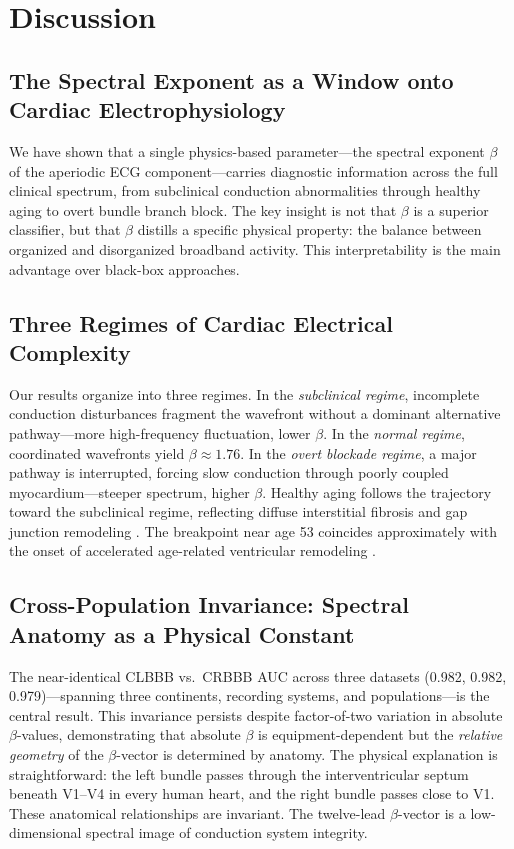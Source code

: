 \documentclass[11pt,a4paper]{article}
\begin{document}
\section{Discussion}
\subsection{The Spectral Exponent as a Window onto Cardiac Electrophysiology}
We have shown that a single physics-based parameter---the spectral exponent $\beta$ of the aperiodic ECG component---carries diagnostic information across the full clinical spectrum, from subclinical conduction abnormalities through healthy aging to overt bundle branch block. The key insight is not that $\beta$ is a superior classifier, but that $\beta$ distills a specific physical property: the balance between organized and disorganized broadband activity. This interpretability is the main advantage over black-box approaches.
\subsection{Three Regimes of Cardiac Electrical Complexity}
Our results organize into three regimes. In the \textit{subclinical regime}, incomplete conduction disturbances fragment the wavefront without a dominant alternative pathway---more high-frequency fluctuation, lower $\beta$. In the \textit{normal regime}, coordinated wavefronts yield $\beta \approx 1.76$. In the \textit{overt blockade regime}, a major pathway is interrupted, forcing slow conduction through poorly coupled myocardium---steeper spectrum, higher $\beta$.
Healthy aging follows the trajectory toward the subclinical regime, reflecting diffuse interstitial fibrosis and gap junction remodeling \citep{deJong2011, Jansen2010}. The breakpoint near age 53 coincides approximately with the onset of accelerated age-related ventricular remodeling \citep{Cheng2009}.
\subsection{Cross-Population Invariance: Spectral Anatomy as a Physical Constant}
The near-identical CLBBB vs.\ CRBBB AUC across three datasets (0.982, 0.982, 0.979)---spanning three continents, recording systems, and populations---is the central result. This invariance persists despite factor-of-two variation in absolute $\beta$-values, demonstrating that absolute $\beta$ is equipment-dependent but the \textit{relative geometry} of the $\beta$-vector is determined by anatomy.
The physical explanation is straightforward: the left bundle passes through the interventricular septum beneath V1--V4 in every human heart, and the right bundle passes close to V1. These anatomical relationships are invariant. The twelve-lead $\beta$-vector is a low-dimensional spectral image of conduction system integrity.
\end{document}
